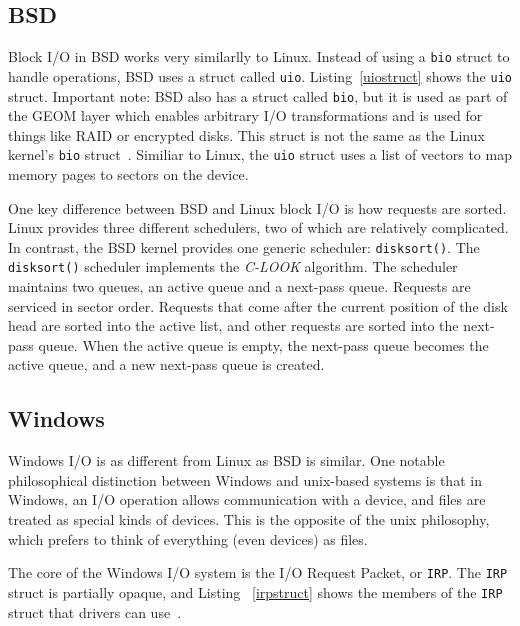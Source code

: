 \documentclass[10pt,journal,draftclsnofoot,onecolumn]{IEEEtran}
\begin{document}
\subsection{BSD}
Block I/O in BSD works very similarlly to Linux. Instead of using
a \texttt{bio} struct to handle operations, BSD uses a struct called
\texttt{uio}\cite{des-imp-bsd-os}. Listing~\ref{uiostruct} shows
the \texttt{uio} struct. 
Important note: BSD also has a struct called \texttt{bio},
but it is used as part of the GEOM layer which enables arbitrary I/O
transformations and is used for things like RAID or encrypted disks.
This struct is not the same as the Linux kernel's \texttt{bio}
struct~\cite{geom}.
Similiar to Linux, the \texttt{uio} struct uses a list of vectors
to map memory pages to sectors on the device.



One key difference between BSD and Linux block I/O is how requests are
sorted. Linux provides three different schedulers, two of which are
relatively complicated. In contrast, the BSD kernel provides one generic
scheduler: \texttt{disksort()}. The \texttt{disksort()} scheduler implements
the \textit{C-LOOK} algorithm. The scheduler maintains two queues, an active
queue and a next-pass queue. Requests are serviced in sector order.
Requests that come after the current position
of the disk head are sorted into the active list, and other requests
are sorted into the next-pass queue. When the active queue is empty,
the next-pass queue becomes the active queue, and a new next-pass queue
is created\cite{des-imp-bsd-os}.

\subsection{Windows}
Windows I/O is as different from Linux as BSD is similar.
One notable philosophical distinction between Windows and unix-based
systems is that in Windows, an I/O operation allows communication with
a device, and files are treated as special kinds of devices.
This is the opposite of the unix philosophy, which prefers to think
of everything (even devices) as files\cite{win-int-two}.

The core of the Windows I/O system is the I/O Request Packet, or
\texttt{IRP}. The \texttt{IRP} struct is partially opaque, and
Listing ~\ref{irpstruct} shows the members of the
\texttt{IRP} struct that drivers can use~\cite{msdn}.
\end{document}

